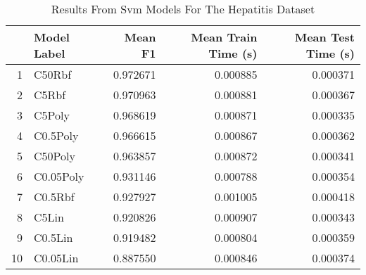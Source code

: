\begin{table}
\centering
\caption{Results From Svm Models For The Hepatitis Dataset}
\label{tab:svm_results_hepatitis}
\begin{tabular}{rlrrr}
\toprule
 & Model Label & Mean F1 & Mean Train Time (s) & Mean Test Time (s) \\
\midrule
1 & C50Rbf & 0.972671 & 0.000885 & 0.000371 \\
2 & C5Rbf & 0.970963 & 0.000881 & 0.000367 \\
3 & C5Poly & 0.968619 & 0.000871 & 0.000335 \\
4 & C0.5Poly & 0.966615 & 0.000867 & 0.000362 \\
5 & C50Poly & 0.963857 & 0.000872 & 0.000341 \\
6 & C0.05Poly & 0.931146 & 0.000788 & 0.000354 \\
7 & C0.5Rbf & 0.927927 & 0.001005 & 0.000418 \\
8 & C5Lin & 0.920826 & 0.000907 & 0.000343 \\
9 & C0.5Lin & 0.919482 & 0.000804 & 0.000359 \\
10 & C0.05Lin & 0.887550 & 0.000846 & 0.000374 \\
\bottomrule
\end{tabular}
\end{table}
